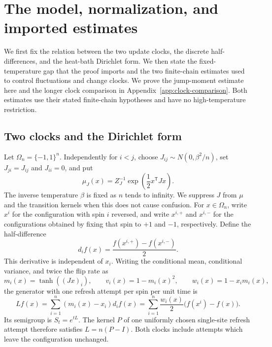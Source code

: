 \section{The model, normalization, and imported estimates}
\label{sec:model}

We first fix the relation between the two update clocks, the discrete
half-differences, and the heat-bath Dirichlet form.  We then state the
fixed-temperature gap that the proof imports and the two finite-chain
estimates used to control fluctuations and change clocks. We prove the
jump-moment estimate here and the longer clock comparison in
Appendix~\ref{app:clock-comparison}. Both estimates use their stated
finite-chain hypotheses and have no high-temperature restriction.

\subsection{Two clocks and the Dirichlet form}

Let \(\Omega_n=\{-1,1\}^n\).  Independently for \(i<j\), choose
\(J_{ij}\sim N(0,\beta^2/n)\), set \(J_{ji}=J_{ij}\) and \(J_{ii}=0\), and put
\[
 \mu_J(x)=Z_J^{-1}\exp\!\left(\frac12x^{\mathsf T}Jx\right).
\]
The inverse temperature \(\beta\) is fixed as \(n\) tends to infinity.
We suppress \(J\) from \(\mu\) and the transition kernels when this
does not cause confusion.
For \(x\in\Omega_n\), write \(x^i\) for the configuration with spin \(i\)
reversed, and write \(x^{i,+}\) and \(x^{i,-}\) for the configurations
obtained by fixing that spin to \(+1\) and \(-1\), respectively.
Define the half-difference
\[
 d_i f(x)=\frac{f(x^{i,+})-f(x^{i,-})}{2}.
\]
This derivative is independent of \(x_i\).  Writing the conditional
mean, conditional variance, and twice the flip rate as
\[
 m_i(x)=\tanh((Jx)_i),\qquad
 v_i(x)=1-m_i(x)^2,\qquad
 w_i(x)=1-x_i m_i(x),
\]
the generator with one refresh attempt per spin per unit time is
\begin{equation}
 Lf(x)=\sum_{i=1}^n (m_i(x)-x_i)d_i f(x)
      =\sum_{i=1}^n\frac{w_i(x)}2\bigl(f(x^i)-f(x)\bigr).
 \label{eq:model-generator}
\end{equation}
Its semigroup is \(S_t=e^{tL}\).
The kernel \(P\) of one uniformly chosen single-site refresh attempt
therefore satisfies \(L=n(P-I)\).
Both clocks include attempts which leave the configuration unchanged.

